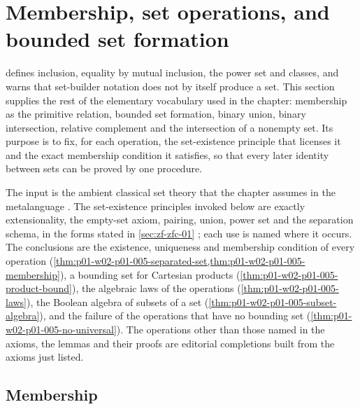 \section{Membership, set operations, and bounded set formation}
\label{sec:p01-w02-p01-005-set-operations}

 defines inclusion, equality by mutual
inclusion, the power set and classes, and warns that set-builder notation does
not by itself produce a set. This section supplies the rest of the elementary
vocabulary used in the chapter: membership as the primitive relation, bounded
set formation, binary union, binary intersection, relative complement and the
intersection of a nonempty set. Its purpose is to fix, for each operation, the
set-existence principle that licenses it and the exact membership condition it
satisfies, so that every later identity between sets can be proved by one
procedure.

The input is the ambient classical set theory that the chapter assumes in the
metalanguage \cite[ch.~``Sets, Relations, Functions, and Cardinality'',
opening paragraph]{FrozenFormalLogicSetOperations}. The set-existence
principles invoked below are exactly extensionality, the empty-set axiom,
pairing, union, power set and the separation schema, in the forms stated in
\cref{sec:zf-zfc-01} \cite[ch.~``The Axioms of ZF and ZFC'', sec.~``The
language and the axiom schemas'']{FrozenFormalLogicSetOperations}; each use is
named where it occurs. The conclusions are the existence, uniqueness and
membership condition of every operation
(\cref{thm:p01-w02-p01-005-separated-set,thm:p01-w02-p01-005-membership}),
a bounding set for Cartesian products
(\cref{thm:p01-w02-p01-005-product-bound}), the algebraic laws of the
operations (\cref{thm:p01-w02-p01-005-laws}), the Boolean algebra of subsets
of a set (\cref{thm:p01-w02-p01-005-subset-algebra}), and the failure of the
operations that have no bounding set (\cref{thm:p01-w02-p01-005-no-universal}).
The operations other than those named in the axioms, the lemmas and their
proofs are editorial completions built from the axioms just listed.

\subsection{Membership}
\label{sec:p01-w02-p01-005-membership}

